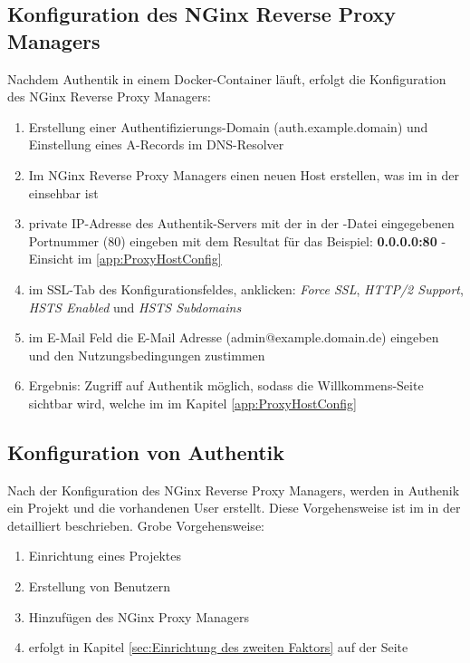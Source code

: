 \subsection{Konfiguration des NGinx Reverse Proxy Managers}
\label{sec:Konfiguration des NGinx Reverse Proxy Managers}
Nachdem Authentik in einem Docker-Container läuft, erfolgt die Konfiguration des NGinx Reverse Proxy Managers:
\begin{enumerate}[label=\arabic*.]
    \item Erstellung einer Authentifizierungs-Domain (auth.example.domain) und Einstellung eines A-Records im DNS-Resolver
    \item Im NGinx Reverse Proxy Managers einen neuen Host erstellen, was im  in der  einsehbar ist
    \item private IP-Adresse des Authentik-Servers mit der in der \textbf{}-Datei eingegebenen Portnummer (80) eingeben 
    mit dem Resultat für das Beispiel: \textbf{0.0.0.0:80} - Einsicht im \ref{app:ProxyHostConfig} 
    \item im SSL-Tab des Konfigurationsfeldes, anklicken: \textit{Force SSL}, \textit{HTTP/2 Support}, \textit{HSTS Enabled} und \textit{HSTS Subdomains}
    \item im E-Mail Feld die E-Mail Adresse (admin@example.domain.de) eingeben und den Nutzungsbedingungen zustimmen
    \item Ergebnis: Zugriff auf Authentik möglich, sodass die Willkommens-Seite sichtbar wird, welche im  im Kapitel 
    \ref{app:ProxyHostConfig} 
\end{enumerate}

\subsection{Konfiguration von Authentik}
\label{sec: Konfiguration von Authentik}
Nach der Konfiguration des NGinx Reverse Proxy Managers, werden in Authenik ein Projekt und die vorhandenen User erstellt. Diese Vorgehensweise 
ist im  in der  detailliert beschrieben.
Grobe Vorgehensweise:
\begin{enumerate}
    \item Einrichtung eines Projektes
    \item Erstellung von Benutzern
    \item Hinzufügen des NGinx Proxy Managers
    \item {} erfolgt in Kapitel \ref*{sec:Einrichtung des zweiten Faktors} auf der 
    Seite \pageref{sec:Einrichtung des zweiten Faktors}
\end{enumerate}


